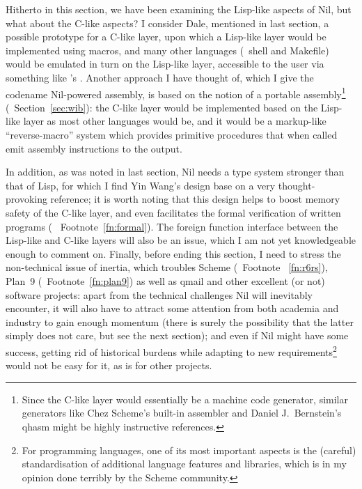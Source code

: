 Hitherto in this section, we have been examining the Lisp-like aspects of Nil,
but what about the C-like aspects?  I consider Dale, mentioned in last section,
a possible prototype for a C-like layer, upon which a Lisp-like layer would
be implemented using macros, and many other languages (\eg~shell and Makefile)
would be emulated in turn on the Lisp-like layer, accessible to the user via
something like 's .  Another approach I
have thought of, which I give the codename Nil-powered assembly, is based on the
notion of a portable assembly\footnote{Since the C-like layer would essentially
be a machine code generator, similar generators like Chez Scheme's built-in
assembler and Daniel J.\ Bernstein's qhasm might be highly instructive
references.} (\cf~Section~\ref{sec:wib}): the C-like layer would be implemented
based on the Lisp-like layer as most other languages would be, and it
would be a markup-like ``reverse-macro'' system which provides primitive
procedures that when called emit assembly instructions to the output.

In addition, as was noted in last section, Nil needs a type system stronger than
that of Lisp, for which I find Yin Wang's design base on %
 a very thought-provoking reference;
it is worth noting that this design helps to boost memory safety of the C-like
layer, and even facilitates the formal verification of written programs (\cf~%
Footnote~\ref{fn:formal}).  The foreign function interface between the Lisp-like
and C-like layers will also be an issue, which I am not yet knowledgeable enough
to comment on.  Finally, before ending this section, I need to stress the
non-technical issue of inertia, which troubles Scheme (\cf~Footnote~%
\ref{fn:r6rs}), Plan~9 (\cf~Footnote~\ref{fn:plan9}) as well as qmail and
other excellent (or not) software projects: apart from the technical challenges
Nil will inevitably encounter, it will also have to attract some attention
from both academia and industry to gain enough momentum (there is surely the
possibility that the latter simply does not care, but see the next section);
and even if Nil might have some success, getting rid of historical burdens
while adapting to new requirements\footnote{For programming languages, one
of its most important aspects is the (careful) standardisation of additional
language features and libraries, which is in my opinion done terribly by
the Scheme community.} would not be easy for it, as is for other projects.

